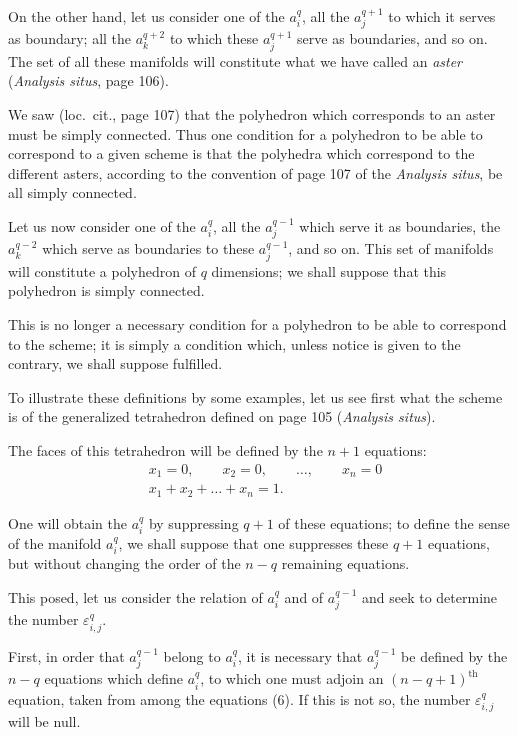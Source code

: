 \documentclass{article}
\begin{document}

On the other hand, let us consider one of the $a^{q}_{i}$, all the $a^{q+1}_{j}$ to which it serves as boundary; all the $a^{q+2}_{k}$ to which these $a^{q+1}_{j}$ serve as boundaries, and so on. The set of all these manifolds will constitute what we have called an \emph{aster} (\emph{Analysis situs}, page 106).

We saw (loc.\ cit., page 107) that the polyhedron which corresponds to an aster must be simply connected. Thus one condition for a polyhedron to be able to correspond to a given scheme is that the polyhedra which correspond to the different asters, according to the convention of page 107 of the \emph{Analysis situs}, be all simply connected.

Let us now consider one of the $a^{q}_{i}$, all the $a^{q-1}_{j}$ which serve it as boundaries, the $a^{q-2}_{k}$ which serve as boundaries to these $a^{q-1}_{j}$, and so on. This set of manifolds will constitute a polyhedron of $q$ dimensions; we shall suppose that this polyhedron is simply connected.

This is no longer a necessary condition for a polyhedron to be able to correspond to the scheme; it is simply a condition which, unless notice is given to the contrary, we shall suppose fulfilled.

To illustrate these definitions by some examples, let us see first what the scheme is of the generalized tetrahedron defined on page 105 (\emph{Analysis situs}).

The faces of this tetrahedron will be defined by the $n+1$ equations:
\[ \begin{aligned} &x_{1} = 0, \qquad x_{2} = 0, \qquad \ldots, \qquad x_{n} = 0\\ &x_{1} + x_{2} + \ldots + x_{n} = 1. \end{aligned} \tag{6} \]

One will obtain the $a^{q}_{i}$ by suppressing $q+1$ of these equations; to define the sense of the manifold $a^{q}_{i}$, we shall suppose that one suppresses these $q+1$ equations, but without changing the order of the $n-q$ remaining equations.

This posed, let us consider the relation of $a^{q}_{i}$ and of $a^{q-1}_{j}$ and seek to determine the number $\varepsilon^{q}_{i,j}$.

First, in order that $a^{q-1}_{j}$ belong to $a^{q}_{i}$, it is necessary that $a^{q-1}_{j}$ be defined by the $n-q$ equations which define $a^{q}_{i}$, to which one must adjoin an $(n-q+1)^{\text{th}}$ equation, taken from among the equations (6). If this is not so, the number $\varepsilon^{q}_{i,j}$ will be null.
\end{document}
